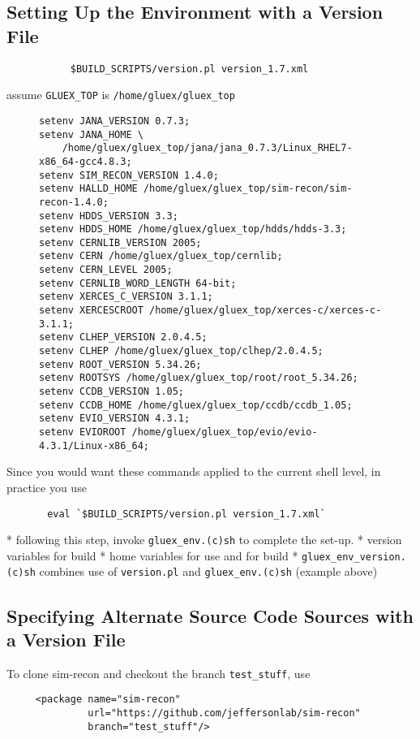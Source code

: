 \documentclass[12pt]{article}
\begin{document}
\subsection{Setting Up the Environment with a Version File}

\begin{verbatim}
           $BUILD_SCRIPTS/version.pl version_1.7.xml
\end{verbatim}
assume {\tt GLUEX\_TOP} is {\tt /home/gluex/gluex\_top}

\begin{figure}
\small
\begin{verbatim}
setenv JANA_VERSION 0.7.3;
setenv JANA_HOME \
    /home/gluex/gluex_top/jana/jana_0.7.3/Linux_RHEL7-x86_64-gcc4.8.3;
setenv SIM_RECON_VERSION 1.4.0;
setenv HALLD_HOME /home/gluex/gluex_top/sim-recon/sim-recon-1.4.0;
setenv HDDS_VERSION 3.3;
setenv HDDS_HOME /home/gluex/gluex_top/hdds/hdds-3.3;
setenv CERNLIB_VERSION 2005;
setenv CERN /home/gluex/gluex_top/cernlib;
setenv CERN_LEVEL 2005;
setenv CERNLIB_WORD_LENGTH 64-bit;
setenv XERCES_C_VERSION 3.1.1;
setenv XERCESCROOT /home/gluex/gluex_top/xerces-c/xerces-c-3.1.1;
setenv CLHEP_VERSION 2.0.4.5;
setenv CLHEP /home/gluex/gluex_top/clhep/2.0.4.5;
setenv ROOT_VERSION 5.34.26;
setenv ROOTSYS /home/gluex/gluex_top/root/root_5.34.26;
setenv CCDB_VERSION 1.05;
setenv CCDB_HOME /home/gluex/gluex_top/ccdb/ccdb_1.05;
setenv EVIO_VERSION 4.3.1;
setenv EVIOROOT /home/gluex/gluex_top/evio/evio-4.3.1/Linux-x86_64;
\end{verbatim}
\end{figure}
Since you would want these commands applied to the current shell level, in practice you use
\begin{verbatim}
       eval `$BUILD_SCRIPTS/version.pl version_1.7.xml`
\end{verbatim}
* following this step, invoke {\tt gluex\_env.(c)sh} to complete the set-up.
* version variables for build
* home variables for use and for build
* {\tt gluex\_env\_version.(c)sh} combines use of {\tt version.pl} and {\tt gluex\_env.(c)sh} (example above)

\subsection{Specifying Alternate Source Code Sources with a Version File}
To clone sim-recon and checkout the branch {\tt test\_stuff}, use
\begin{verbatim}
     <package name="sim-recon"
              url="https://github.com/jeffersonlab/sim-recon"
              branch="test_stuff"/>
\end{verbatim}
\end{document}
